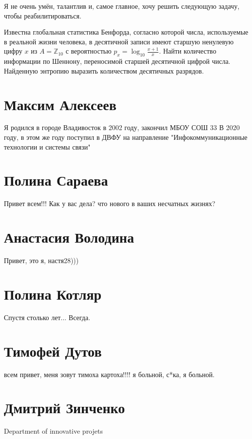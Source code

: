 \documentclass[labwork]{fefudoc}
\begin{document}
Я не очень умён, талантлив и, самое главное, хочу решить следующую задачу, чтобы реабилитироваться.

Известна глобальная статистика Бенфорда, согласно которой числа, используемые в реальной жизни человека, в десятичной записи имеют старшую ненулевую цифру $x$ из $A = \mathbb{Z}_{10}$ с вероятностью $p_x = \log_{10} \frac{x + 1}{x}$.
Найти количество информации по Шеннону, переносимой старшей десятичной цифрой числа.
Найденную энтропию выразить количеством десятичных разрядов.

\section{Максим Алексеев}
Я родился в городе Владивосток в 2002 году, закончил МБОУ СОШ 33 В 2020 году, в этом же году поступил в ДВФУ на направление "Инфокоммуникационные технологии и системы связи"
\section{Полина Сараева}

Привет всем!!! Как у вас дела? что нового в ваших несчатных жизнях?

\section{Анастасия Володина}
Привет, это я, настя28))) 
\section{Полина Котляр}

Спустя столько лет...
Всегда.

\section{Тимофей Дутов}

всем привет, меня зовут тимоха картоха!!!!
я больной, с*ка, я больной.


\section{Дмитрий Зинченко}
Department of innovative projets
\end{document}
